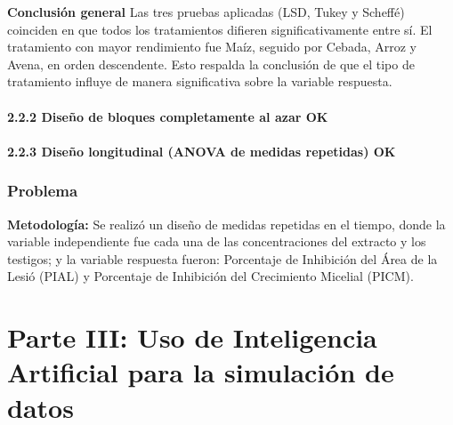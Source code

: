 \documentclass[
  spanish,
  letterpaper,
  DIV=11,
  numbers=noendperiod]{scrreprt}
\begin{document}
\textbf{Conclusión general} Las tres pruebas aplicadas (LSD, Tukey y
Scheffé) coinciden en que todos los tratamientos difieren
significativamente entre sí. El tratamiento con mayor rendimiento fue
Maíz, seguido por Cebada, Arroz y Avena, en orden descendente. Esto
respalda la conclusión de que el tipo de tratamiento influye de manera
significativa sobre la variable respuesta.

\subsubsection{2.2.2 Diseño de bloques completamente al azar
OK}\label{diseuxf1o-de-bloques-completamente-al-azar-ok}

\subsubsection{2.2.3 Diseño longitudinal (ANOVA de medidas repetidas)
OK}\label{diseuxf1o-longitudinal-anova-de-medidas-repetidas-ok}

\subsection{Problema}\label{problema-1}

\begin{tcolorbox}[enhanced jigsaw, titlerule=0mm, arc=.35mm, rightrule=.15mm, bottomrule=.15mm, leftrule=.75mm, colbacktitle=quarto-callout-important-color!10!white, colframe=quarto-callout-important-color-frame, coltitle=black, opacityback=0, colback=white, toptitle=1mm, opacitybacktitle=0.6, toprule=.15mm, bottomtitle=1mm, title=\textcolor{quarto-callout-important-color}{\faExclamation}\hspace{0.5em}{Importante}, left=2mm, breakable]

\textbf{Metodología:} Se realizó un diseño de medidas repetidas en el
tiempo, donde la variable independiente fue cada una de las
concentraciones del extracto y los testigos; y la variable respuesta
fueron: Porcentaje de Inhibición del Área de la Lesió (PIAL) y
Porcentaje de Inhibición del Crecimiento Micelial (PICM).

\end{tcolorbox}


\chapter{Parte III: Uso de Inteligencia Artificial para la simulación de
datos}\label{parte-iii-uso-de-inteligencia-artificial-para-la-simulaciuxf3n-de-datos}
\end{document}
